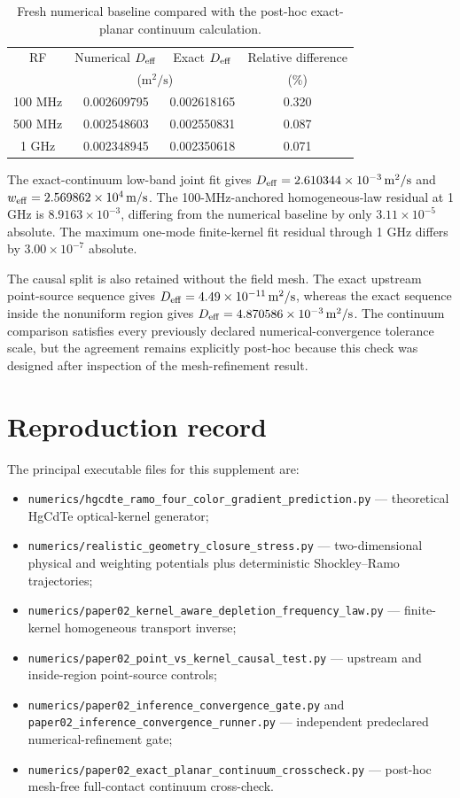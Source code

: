 \documentclass[aps,pra,onecolumn,superscriptaddress,nofootinbib]{revtex4-2}
\begin{document}
\begin{table}[h]
\caption{Fresh numerical baseline compared with the post-hoc exact-planar continuum calculation.}
\centering
\begin{tabular}{cccc}
\toprule
RF & Numerical $D_{\rm eff}$ & Exact $D_{\rm eff}$ & Relative difference\\
 & \multicolumn{2}{c}{($\mathrm{m^2/s}$)} & (\%)\\
\midrule
100 MHz & 0.002609795 & 0.002618165 & 0.320\\
500 MHz & 0.002548603 & 0.002550831 & 0.087\\
1 GHz   & 0.002348945 & 0.002350618 & 0.071\\
\bottomrule
\end{tabular}
\end{table}

The exact-continuum low-band joint fit gives $D_{\rm eff}=2.610344\times10^{-3}\,\mathrm{m^2/s}$ and $w_{\rm eff}=2.569862\times10^4\,\mathrm{m/s}$.  The 100-MHz-anchored homogeneous-law residual at 1 GHz is $8.9163\times10^{-3}$, differing from the numerical baseline by only $3.11\times10^{-5}$ absolute.  The maximum one-mode finite-kernel fit residual through 1 GHz differs by $3.00\times10^{-7}$ absolute.

The causal split is also retained without the field mesh.  The exact upstream point-source sequence gives $D_{\rm eff}=4.49\times10^{-11}\,\mathrm{m^2/s}$, whereas the exact sequence inside the nonuniform region gives $D_{\rm eff}=4.870586\times10^{-3}\,\mathrm{m^2/s}$.  The continuum comparison satisfies every previously declared numerical-convergence tolerance scale, but the agreement remains explicitly post-hoc because this check was designed after inspection of the mesh-refinement result.

\section{Reproduction record}

The principal executable files for this supplement are:
\begin{itemize}
\item \texttt{numerics/hgcdte\_ramo\_four\_color\_gradient\_prediction.py} --- theoretical HgCdTe optical-kernel generator;
\item \texttt{numerics/realistic\_geometry\_closure\_stress.py} --- two-dimensional physical and weighting potentials plus deterministic Shockley--Ramo trajectories;
\item \texttt{numerics/paper02\_kernel\_aware\_depletion\_frequency\_law.py} --- finite-kernel homogeneous transport inverse;
\item \texttt{numerics/paper02\_point\_vs\_kernel\_causal\_test.py} --- upstream and inside-region point-source controls;
\item \texttt{numerics/paper02\_inference\_convergence\_gate.py} and \texttt{paper02\_inference\_convergence\_runner.py} --- independent predeclared numerical-refinement gate;
\item \texttt{numerics/paper02\_exact\_planar\_continuum\_crosscheck.py} --- post-hoc mesh-free full-contact continuum cross-check.
\end{itemize}
\end{document}
